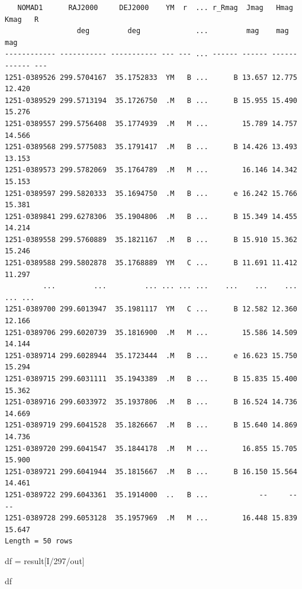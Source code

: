 \documentclass[
  letterpaper,
  DIV=11,
  numbers=noendperiod]{scrreprt}
\newenvironment{Shaded}{\begin{snugshade}}{\end{snugshade}}
\newcommand{\NormalTok}[1]{\textcolor[rgb]{0.00,0.23,0.31}{#1}}
\newcommand{\OperatorTok}[1]{\textcolor[rgb]{0.37,0.37,0.37}{#1}}
\newcommand{\StringTok}[1]{\textcolor[rgb]{0.13,0.47,0.30}{#1}}
\begin{document}
\begin{verbatim}
   NOMAD1      RAJ2000     DEJ2000    YM  r  ... r_Rmag  Jmag   Hmag   Kmag   R 
                 deg         deg             ...         mag    mag    mag      
------------ ----------- ----------- --- --- ... ------ ------ ------ ------ ---
1251-0389526 299.5704167  35.1752833  YM   B ...      B 13.657 12.775 12.420    
1251-0389529 299.5713194  35.1726750  .M   B ...      B 15.955 15.490 15.276    
1251-0389557 299.5756408  35.1774939  .M   M ...        15.789 14.757 14.566    
1251-0389568 299.5775083  35.1791417  .M   B ...      B 14.426 13.493 13.153    
1251-0389573 299.5782069  35.1764789  .M   M ...        16.146 14.342 15.153    
1251-0389597 299.5820333  35.1694750  .M   B ...      e 16.242 15.766 15.381    
1251-0389841 299.6278306  35.1904806  .M   B ...      B 15.349 14.455 14.214    
1251-0389558 299.5760889  35.1821167  .M   B ...      B 15.910 15.362 15.246    
1251-0389588 299.5802878  35.1768889  YM   C ...      B 11.691 11.412 11.297    
         ...         ...         ... ... ... ...    ...    ...    ...    ... ...
1251-0389700 299.6013947  35.1981117  YM   C ...      B 12.582 12.360 12.166    
1251-0389706 299.6020739  35.1816900  .M   M ...        15.586 14.509 14.144    
1251-0389714 299.6028944  35.1723444  .M   B ...      e 16.623 15.750 15.294    
1251-0389715 299.6031111  35.1943389  .M   B ...      B 15.835 15.400 15.362    
1251-0389716 299.6033972  35.1937806  .M   B ...      B 16.524 14.736 14.669    
1251-0389719 299.6041528  35.1826667  .M   B ...      B 15.640 14.869 14.736    
1251-0389720 299.6041547  35.1844178  .M   M ...        16.855 15.705 15.900    
1251-0389721 299.6041944  35.1815667  .M   B ...      B 16.150 15.564 14.461    
1251-0389722 299.6043361  35.1914000  ..   B ...            --     --     --    
1251-0389728 299.6053128  35.1957969  .M   M ...        16.448 15.839 15.647    
Length = 50 rows
\end{verbatim}

\begin{Shaded}
\begin{Highlighting}[]
\NormalTok{df }\OperatorTok{=}\NormalTok{ result[}\StringTok{\textquotesingle{}I/297/out\textquotesingle{}}\NormalTok{]}
\end{Highlighting}
\end{Shaded}

\begin{Shaded}
\begin{Highlighting}[]
\NormalTok{df}
\end{Highlighting}
\end{Shaded}
\end{document}

